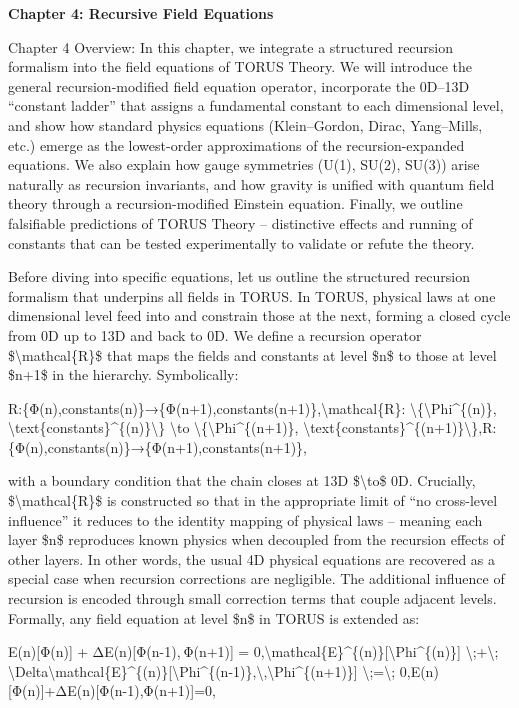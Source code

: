 \documentclass[
]{article}
\author{}
\date{}
\begin{document}
\textbf{Chapter 4: Recursive Field Equations}

Chapter 4 Overview: In this chapter, we integrate a structured recursion
formalism into the field equations of TORUS Theory. We will introduce
the general recursion-modified field equation operator, incorporate the
0D--13D ``constant ladder'' that assigns a fundamental constant to each
dimensional level, and show how standard physics equations
(Klein--Gordon, Dirac, Yang--Mills, etc.) emerge as the lowest-order
approximations of the recursion-expanded equations. We also explain how
gauge symmetries (U(1), SU(2), SU(3)) arise naturally as recursion
invariants, and how gravity is unified with quantum field theory through
a recursion-modified Einstein equation. Finally, we outline falsifiable
predictions of TORUS Theory -- distinctive effects and running of
constants that can be tested experimentally to validate or refute the
theory.

Before diving into specific equations, let us outline the structured
recursion formalism that underpins all fields in TORUS. In TORUS,
physical laws at one dimensional level feed into and constrain those at
the next, forming a closed cycle from 0D up to 13D and back to 0D. We
define a recursion operator \$\textbackslash mathcal\{R\}\$ that maps
the fields and constants at level \$n\$ to those at level \$n+1\$ in the
hierarchy. Symbolically:

R:\{Φ(n),constants(n)\}→\{Φ(n+1),constants(n+1)\},\textbackslash mathcal\{R\}:
\textbackslash\{\textbackslash Phi\^{}\{(n)\},
\textbackslash text\{constants\}\^{}\{(n)\}\textbackslash\}
\textbackslash to \textbackslash\{\textbackslash Phi\^{}\{(n+1)\},
\textbackslash text\{constants\}\^{}\{(n+1)\}\textbackslash\},R:\{Φ(n),constants(n)\}→\{Φ(n+1),constants(n+1)\},

with a boundary condition that the chain closes at 13D
\$\textbackslash to\$ 0D. Crucially, \$\textbackslash mathcal\{R\}\$ is
constructed so that in the appropriate limit of ``no cross-level
influence'' it reduces to the identity mapping of physical laws --
meaning each layer \$n\$ reproduces known physics when decoupled from
the recursion effects of other layers. In other words, the usual 4D
physical equations are recovered as a special case when recursion
corrections are negligible. The additional influence of recursion is
encoded through small correction terms that couple adjacent levels.
Formally, any field equation at level \$n\$ in TORUS is extended as:

E(n){[}Φ(n){]}  +  ΔE(n){[}Φ(n-1), Φ(n+1){]}  =  0,\textbackslash mathcal\{E\}\^{}\{(n)\}{[}\textbackslash Phi\^{}\{(n)\}{]}
\textbackslash;+\textbackslash;
\textbackslash Delta\textbackslash mathcal\{E\}\^{}\{(n)\}{[}\textbackslash Phi\^{}\{(n-1)\},\textbackslash,\textbackslash Phi\^{}\{(n+1)\}{]}
\textbackslash;=\textbackslash;
0,E(n){[}Φ(n){]}+ΔE(n){[}Φ(n-1),Φ(n+1){]}=0,
\end{document}
